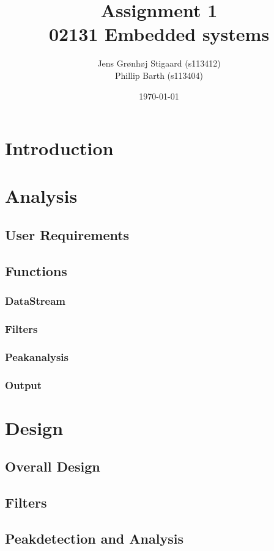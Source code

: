 \documentclass[12pt, danish, a4paper, titlepage]{article}
\title{{\huge Assignment 1}\\02131 Embedded systems}
\author{
		Jens Grønhøj Stigaard 	(s113412)\\
		Phillip Barth 		(s113404)
}
\date{\small \today}
\begin{document}
	\maketitle	
	
	\tableofcontents

	\section{Introduction}
	
	\section{Analysis}
		\subsection{User Requirements}
		\subsection{Functions}
			\subsubsection{DataStream}
			\subsubsection{Filters}
			\subsubsection{Peakanalysis}
			\subsubsection{Output}
			
	\section{Design}
		\subsection{Overall Design}
		\subsection{Filters}
		\subsection{Peakdetection and Analysis}
\end{document}
